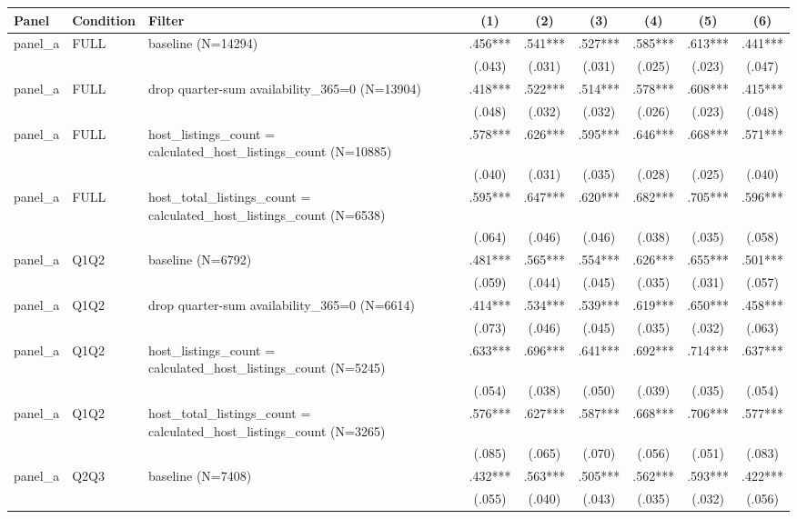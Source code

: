 \begin{tabular}{lllcccccc}
\hline
Panel & Condition & Filter & (1) & (2) & (3) & (4) & (5) & (6) \\
\hline
panel\_a & FULL & baseline (N=14294) & .456*** & .541*** & .527*** & .585*** & .613*** & .441***
\\
 &  &  & (.043) & (.031) & (.031) & (.025) & (.023) & (.047)
\\
panel\_a & FULL & drop quarter-sum availability\_365=0 (N=13904) & .418*** & .522*** & .514*** & .578*** & .608*** & .415***
\\
 &  &  & (.048) & (.032) & (.032) & (.026) & (.023) & (.048)
\\
panel\_a & FULL & host\_listings\_count = calculated\_host\_listings\_count (N=10885) & .578*** & .626*** & .595*** & .646*** & .668*** & .571***
\\
 &  &  & (.040) & (.031) & (.035) & (.028) & (.025) & (.040)
\\
panel\_a & FULL & host\_total\_listings\_count = calculated\_host\_listings\_count (N=6538) & .595*** & .647*** & .620*** & .682*** & .705*** & .596***
\\
 &  &  & (.064) & (.046) & (.046) & (.038) & (.035) & (.058)
\\
panel\_a & Q1Q2 & baseline (N=6792) & .481*** & .565*** & .554*** & .626*** & .655*** & .501***
\\
 &  &  & (.059) & (.044) & (.045) & (.035) & (.031) & (.057)
\\
panel\_a & Q1Q2 & drop quarter-sum availability\_365=0 (N=6614) & .414*** & .534*** & .539*** & .619*** & .650*** & .458***
\\
 &  &  & (.073) & (.046) & (.045) & (.035) & (.032) & (.063)
\\
panel\_a & Q1Q2 & host\_listings\_count = calculated\_host\_listings\_count (N=5245) & .633*** & .696*** & .641*** & .692*** & .714*** & .637***
\\
 &  &  & (.054) & (.038) & (.050) & (.039) & (.035) & (.054)
\\
panel\_a & Q1Q2 & host\_total\_listings\_count = calculated\_host\_listings\_count (N=3265) & .576*** & .627*** & .587*** & .668*** & .706*** & .577***
\\
 &  &  & (.085) & (.065) & (.070) & (.056) & (.051) & (.083)
\\
panel\_a & Q2Q3 & baseline (N=7408) & .432*** & .563*** & .505*** & .562*** & .593*** & .422***
\\
 &  &  & (.055) & (.040) & (.043) & (.035) & (.032) & (.056)

\end{tabular}
